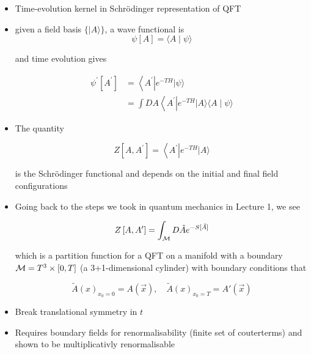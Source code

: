 \label{sec:schrodinger_functional}
\begin{itemize}
  \item Time-evolution kernel in Schr\"odinger representation of QFT
  \item given a field basis \(\{|A\rangle\}\), a wave functional is
\begin{equation}
    \psi[A]=\langle A \mid \psi\rangle
\end{equation}

and time evolution gives

\begin{equation}
    \begin{aligned}
\psi^{\prime}\left[A^{\prime}\right] & =\left\langle A^{\prime}\right| e^{-TH}|\psi\rangle \\
& =\int D A\left\langle A^{\prime}\right| e^{-T H}|A\rangle\langle A \mid \psi\rangle
\end{aligned}
\end{equation}


  \item The quantity

\begin{equation}
    Z\left[A, A^{\prime}\right]=\left\langle A^{\prime}\right| e^{-T H}|A\rangle
\end{equation}

is the Schr\"odinger functional and depends on the initial and final field configurations

  \item Going back to the steps we took in quantum mechanics in Lecture 1, we see

\begin{equation}
    Z\left[A, A^{\prime}\right]=\int_{{\cal M}} D \tilde{A} e^{-S[\tilde{A}]}
\end{equation}


which is a partition function for a QFT on a manifold with a boundary \({\cal M}=T^{3} \times[0, T]\) (a 3+1-dimensional cylinder)
with boundary conditions that

\begin{equation} 
\widetilde{A}(x)_{x_{0}=0}=A(\vec{x}), \quad\widetilde{A}(x)_{x_{0}=T}=A'(\vec{x})
\end{equation}


  \item Break translational symmetry in \(t\)
  \item Requires boundary fields for renormalisability (finite set of couterterms) and shown to be multiplicativly renormalisable
  

\end{itemize}
